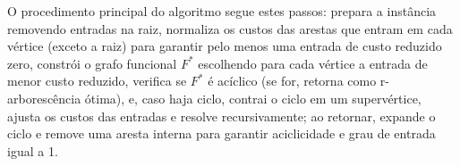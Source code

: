 % 

% 

% 

% 

% 

O procedimento principal do algoritmo segue estes passos: prepara a instância removendo entradas na raiz, normaliza os custos das arestas que entram em cada vértice (exceto a raiz) para garantir pelo menos uma entrada de custo reduzido zero, constrói o grafo funcional $F^*$ escolhendo para cada vértice a entrada de menor custo reduzido, verifica se $F^*$ é acíclico (se for, retorna como r-arborescência ótima), e, caso haja ciclo, contrai o ciclo em um supervértice, ajusta os custos das entradas e resolve recursivamente; ao retornar, expande o ciclo e remove uma aresta interna para garantir aciclicidade e grau de entrada igual a 1.


